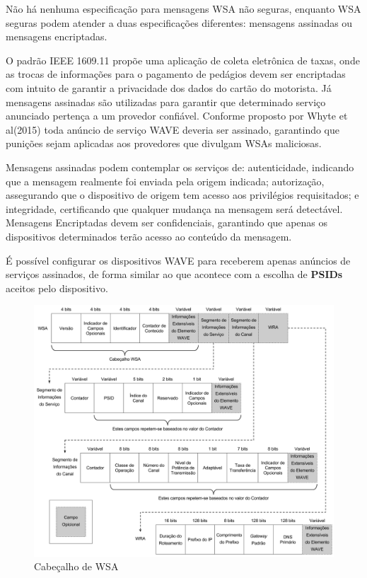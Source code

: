 \documentclass[
12pt,				%
openright,			%
oneside,			%
a4paper,			%
brazil,				%
]{abntex2}
\begin{document}
	\par Não há nenhuma especificação para mensagens WSA não seguras, enquanto WSA seguras podem atender a duas especificações diferentes: mensagens assinadas ou mensagens encriptadas.
	
	\par O padrão IEEE 1609.11 propõe uma aplicação de coleta eletrônica de taxas, onde as trocas de informações para o pagamento de pedágios devem ser encriptadas com intuito de garantir a privacidade dos dados do cartão do motorista. Já mensagens assinadas são utilizadas para garantir que determinado serviço anunciado pertença a um provedor confiável. Conforme proposto por Whyte et al(2015) toda anúncio de serviço WAVE deveria ser assinado, garantindo que punições sejam aplicadas aos provedores que divulgam WSAs maliciosas.
	
	\par Mensagens assinadas podem contemplar os serviços de: autenticidade, indicando que a mensagem realmente foi enviada pela origem indicada; autorização, assegurando que o dispositivo de origem tem acesso aos privilégios requisitados; e integridade, certificando que qualquer mudança na mensagem será detectável. Mensagens Encriptadas devem ser confidenciais, garantindo que apenas os dispositivos determinados terão acesso ao conteúdo da mensagem.
	
	\par É possível configurar os dispositivos WAVE para receberem apenas anúncios de serviços assinados, de forma similar ao que acontece com a escolha de \textbf{PSIDs} aceitos pelo dispositivo.
	
	\begin{figure} [H]
		\centering
		\includegraphics[scale=.3]{figuras/cap3/34CabecalhoWSA}
		\caption{\label{fig_34}Cabeçalho de WSA}
	\end{figure}
	
\end{document}
